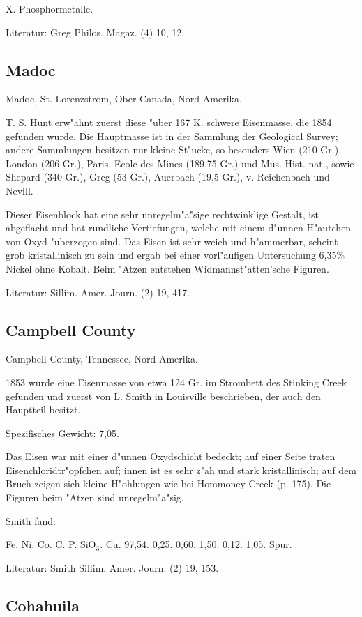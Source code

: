\documentclass[a4paper, 11pt, oneside]{article}
\begin{document}
X. Phosphormetalle.

Literatur: Greg Philos. Magaz. (4) 10, 12.

\subsection{Madoc}

Madoc, St. Lorenzstrom, Ober-Canada, Nord-Amerika.

T. S. Hunt erw"ahnt zuerst diese "uber 167 K. schwere Eisenmasse, die 1854 gefunden wurde. Die Hauptmasse ist in der Sammlung der Geological Survey; andere Sammlungen besitzen nur kleine St"ucke, so besonders Wien (210 Gr.), London (206 Gr.), Paris, Ecole des Mines (189,75 Gr.) und Mus. Hist. nat., sowie Shepard (340 Gr.), Greg (53 Gr.), Auerbach (19,5 Gr.), v. Reichenbach und Nevill.

Dieser Eisenblock hat eine sehr unregelm"a"sige rechtwinklige Gestalt, ist abgeflacht und hat rundliche Vertiefungen, welche mit einem d"unnen H"autchen von Oxyd "uberzogen sind. Das Eisen ist sehr weich und h"ammerbar, scheint grob kristallinisch zu sein und ergab bei einer vorl"aufigen Untersuchung 6,35\% Nickel ohne Kobalt. Beim "Atzen entstehen Widmannst"atten'sche Figuren.

Literatur: Sillim. Amer. Journ. (2) 19, 417.

\subsection{Campbell County}

Campbell County, Tennessee, Nord-Amerika.

1853 wurde eine Eisenmasse von etwa 124 Gr. im Strombett des Stinking Creek gefunden und zuerst von L. Smith in Louisville beschrieben, der auch den Hauptteil besitzt.

Spezifisches Gewicht: 7,05.

Das Eisen war mit einer d"unnen Oxydschicht bedeckt; auf einer Seite traten Eisenchloridtr"opfchen auf; innen ist es sehr z"ah und stark kristallinisch; auf dem Bruch zeigen sich kleine H"ohlungen wie bei Hommoney Creek (p. 175). Die Figuren beim "Atzen sind unregelm"a"sig.

Smith fand:

Fe. Ni. Co. C. P. SiO$_{3}$. Cu.  
97,54. 0,25. 0,60. 1,50. 0,12. 1,05. Spur.

Literatur: Smith Sillim. Amer. Journ. (2) 19, 153.

\subsection{Cohahuila}
\end{document}
